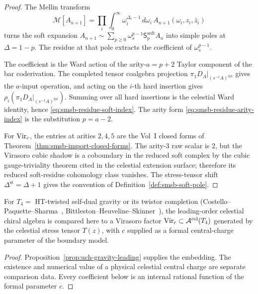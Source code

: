 \begin{proof}
The Mellin transform
\[
 \mathcal M[A_{n+1}]
 =
 \prod_i\int_0^\infty \omega_i^{\Delta_i-1}\,d\omega_i\,
 A_{n+1}(\omega_i,z_i,\bar z_i)
\]
turns the soft expansion
$A_{n+1}\sim\sum_{p\geq0}\omega_s^{p-1}\mathsf S_p^{\mathrm{soft}}A_n$
into simple poles at $\Delta=1-p$. The residue at that pole extracts
the coefficient of $\omega_s^{p-1}$.

The coefficient is the Ward action of the arity-$a=p+2$ Taylor
component of the bar coderivation. The completed tensor coalgebra
projection $\pi_1D_A|_{(s^{-1}A)^{\otimes a}}$ gives the $a$-input
operation, and acting on the $i$-th hard insertion gives
$\rho_i(\pi_1D_A|_{(s^{-1}A)^{\otimes a}})$. Summing over all hard
insertions is the celestial Ward identity, hence
\eqref{eq:smsb-residue-soft-index}. The arity form
\eqref{eq:smsb-residue-arity-index} is the substitution $p=a-2$.

For $\mathrm{Vir}_c$, the entries at arities $2,4,5$ are the Vol~I closed
forms of Theorem~\ref{thm:smsb-import-closed-forms}. The arity-$3$
raw scalar is $2$, but the Virasoro cubic shadow is a coboundary in
the reduced soft complex by the cubic gauge-triviality theorem cited
in the celestial extension surface; therefore its reduced
soft-residue cohomology class vanishes. The stress-tensor shift
$\Delta^{\mathrm{st}}=\Delta+1$ gives the convention of
Definition~\ref{def:smsb-soft-pole}.
\end{proof}

\begin{proposition}
\label{prop:smsb-vir-as-cel}
\ClaimStatusProvedElsewhere
For $T_4 = $ HT-twisted self-dual gravity or its twistor completion
(Costello--Paquette--Sharma~\cite{CostelloPaquetteSharmaCelestial},
Bittleston--Heuveline--Skinner~\cite{BittlestonHeuvelineSkinner}), the
leading-order celestial chiral algebra is compared here to a Virasoro
factor
$\mathrm{Vir}_c \subset \mathcal A^{\mathrm{cel}}(T_4)$ generated by the
celestial stress tensor \(T(z)\), with \(c\) supplied as a formal
central-charge parameter of the boundary model.
\end{proposition}

\begin{proof}
Proposition~\ref{prop:uch-gravity-leading} supplies the embedding. The
existence and numerical value of a physical celestial central charge
are separate comparison data.  Every coefficient below is an internal
rational function of the formal parameter \(c\).
\end{proof}

